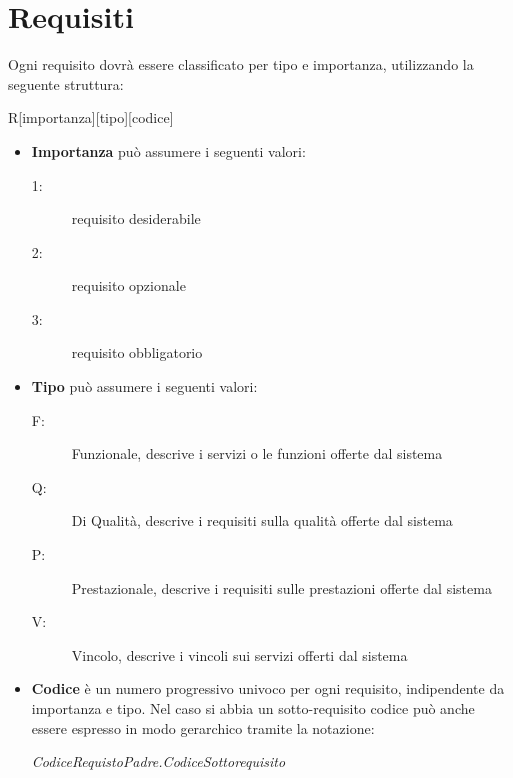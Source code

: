 \documentclass[12pt,a4paper,twoside,openany,english]{book}
\begin{document}
\section{Requisiti}\label{requisiti}
Ogni requisito dovrà essere classificato per tipo e importanza, utilizzando la seguente struttura:
\begin{center}
	R[importanza][tipo][codice]
\end{center}
\begin{itemize}
	\item \textbf{Importanza} può assumere i seguenti valori:
	\begin{description}
		\item[1:] requisito desiderabile
		\item[2:] requisito opzionale
		\item[3:] requisito obbligatorio
	\end{description}
	\item \textbf{Tipo} può assumere i seguenti valori:
	\begin{description}
		\item[F:] Funzionale, descrive i servizi o le funzioni offerte dal sistema
		\item[Q:] Di Qualità, descrive i requisiti sulla qualità offerte dal sistema
		\item[P:] Prestazionale, descrive i requisiti sulle prestazioni offerte dal sistema
		\item[V:] Vincolo, descrive i vincoli sui servizi offerti dal sistema
	\end{description}
	\item \textbf{Codice} è un numero progressivo univoco per ogni requisito, indipendente da importanza e tipo. Nel caso si abbia un sotto-requisito codice può anche essere espresso in modo gerarchico tramite la notazione:
	\begin{center}
		\textit{CodiceRequistoPadre.CodiceSottorequisito}
	\end{center}
\end{itemize}
\begin{small}

\end{small}
\end{document}

